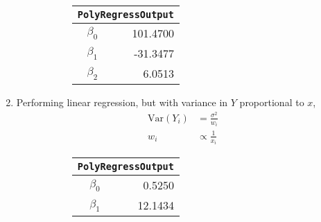 \begin{enumerate}
\begin{figure}[H]
	\begin{subfigure}[]{0.2\linewidth}
		\centering
		\begin{tabular}{@{}rr@{}}
			\toprule
			\multicolumn{2}{c}{\texttt{PolyRegressOutput}} \\
			\midrule
			$\beta_0$ &         101.4700 \\
			$\beta_1$ &         -31.3477 \\
			$\beta_2$ &           6.0513 \\
			\bottomrule
		\end{tabular}
		
	\end{subfigure}
	\begin{subfigure}[]{0.8\linewidth}
		\centering
		
	\end{subfigure}
\end{figure}

\item Performing linear regression, but with variance in $ Y $ proportional to $ x $, \\

\begin{align}
	\mathrm{Var}(Y_i) &= \frac{\sigma^2}{w_i} \nonumber \\
	w_i &\propto \frac{1}{x_i}
\end{align}

\begin{figure}[H]
	\begin{subfigure}[]{0.2\linewidth}
		\centering
		\begin{tabular}{@{}rr@{}}
			\toprule
			\multicolumn{2}{c}{\texttt{PolyRegressOutput}} \\
			\midrule
			$\beta_0$ &           0.5250 \\
			$\beta_1$ &          12.1434 \\
			\bottomrule
		\end{tabular}
		

\end{subfigure}
\end{figure}
\end{enumerate}
